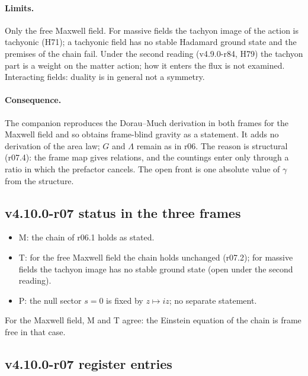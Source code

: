 \paragraph{Limits.}
Only the free Maxwell field.  For massive fields the tachyon image of the action is tachyonic (H71); a tachyonic field has no stable Hadamard
ground state and the premises of the chain fail.  Under the second reading (v4.9.0-r84, H79) the tachyon part is a weight on the matter action; how it
enters the flux is not examined.  Interacting fields: duality is in general not a symmetry.

\paragraph{Consequence.}
The companion reproduces the Dorau--Much derivation in both frames for the Maxwell field and so obtains frame-blind gravity as a statement.  It adds
no derivation of the area law; \(G\) and \(\Lambda\) remain as in r06.  The reason is structural (r07.4): the frame map gives relations,
and the countings enter only through a ratio in which the prefactor cancels.  The open front is one absolute value of \(\gamma\) from the structure.

\subsection*{v4.10.0-r07 status in the three frames}
\label{subsec:v4100-r07-frames}

\begin{itemize}[leftmargin=2em]
\item M: the chain of r06.1 holds as stated.
\item T: for the free Maxwell field the chain holds unchanged (r07.2); for massive fields the tachyon image has no stable ground state (open under
the second reading).
\item P: the null sector \(s=0\) is fixed by \(z\mapsto iz\); no separate statement.
\end{itemize}
For the Maxwell field, M and T agree: the Einstein equation of the chain is frame free in that case.

\subsection*{v4.10.0-r07 register entries}
\label{subsec:v4100-r07-register}

